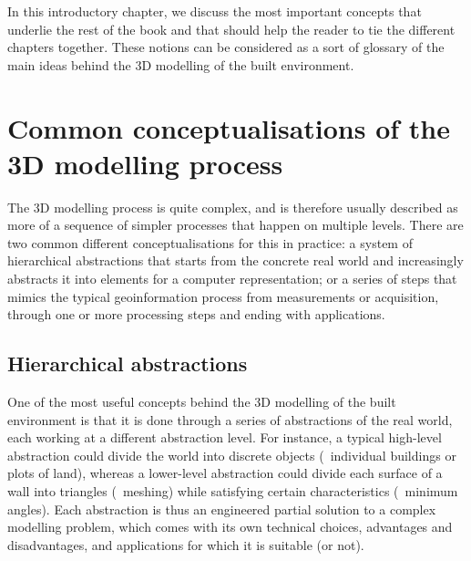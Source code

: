 


In this introductory chapter, we discuss the most important concepts that underlie the rest of the book and that should help the reader to tie the different chapters together.
These notions can be considered as a sort of glossary of the main ideas behind the 3D modelling of the built environment.

\section{Common conceptualisations of the 3D modelling process}

The 3D modelling process is quite complex, and is therefore usually described as more of a sequence of simpler processes that happen on multiple levels.
There are two common different conceptualisations for this in practice: a system of hierarchical abstractions that starts from the concrete real world and increasingly abstracts it into elements for a computer representation; or a series of steps that mimics the typical geoinformation process from measurements or acquisition, through one or more processing steps and ending with applications.

\subsection{Hierarchical abstractions}

One of the most useful concepts behind the 3D modelling of the built environment is that it is done through a series of abstractions of the real world, each working at a different abstraction level.
For instance, a typical high-level abstraction could divide the world into discrete objects (\eg\ individual buildings or plots of land), whereas a lower-level abstraction could divide each surface of a wall into triangles (\ie\ meshing) while satisfying certain characteristics (\eg\ minimum angles).
Each abstraction is thus an engineered partial solution to a complex modelling problem, which comes with its own technical choices, advantages and disadvantages, and applications for which it is suitable (or not).

